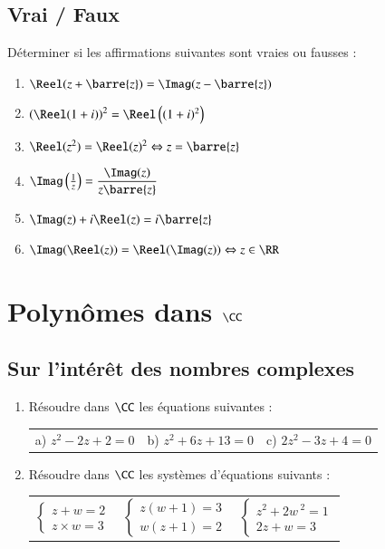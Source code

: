 \documentclass[oneside,12pt]{article}          %
\begin{document}
\subsection{Vrai / Faux}
Déterminer si les affirmations suivantes sont vraies ou fausses :
\begin{enumerate}\setlength{\itemsep}{0.5mm}
	\item $\Reel(z+\barre{z})=\Imag(z-\barre{z})$
    \item $\left(\Reel(1+i)\right)^2=\Reel\left((1+i)^2\right)$
    \item $\Reel(z^2)=\Reel(z)^2 \Leftrightarrow z=\barre{z}$
    \item $\Imag\left(\frac{1}{z}\right)=\dfrac{\Imag(z)}{z\barre{z}}$
    \item $\Imag(z)+i\Reel(z)=i\barre{z}$
    \item $\Imag(\Reel(z))=\Reel(\Imag(z)) \Leftrightarrow z\in\RR$
\end{enumerate}



\section{Polynômes dans $\CC$}

\subsection{Sur l'intérêt des nombres complexes}
\begin{enumerate}
    \item  Résoudre dans $\CC$ les équations suivantes :
    
    \begin{tabular}{p{} p{} p{}}
        a) $z^2-2z+2=0$ & b) $z^2+6z+13=0$ & c) $2z^2-3z+4=0$
    \end{tabular}

    \item Résoudre dans $\CC$ les systèmes d'équations suivants :

    \renewcommand{\arraystretch}{1}
    \begin{tabular}{p{} p{} p{}}
        $\begin{cases}z+w=2\\z\times w=3\end{cases}$ & $\begin{cases}z(w+1)=3\\w(z+1)=2\end{cases}$ & $\begin{cases}z^2+2w\,^2=1\\2z+w=3\end{cases}$ 
    \end{tabular}
\end{enumerate}
\end{document}
